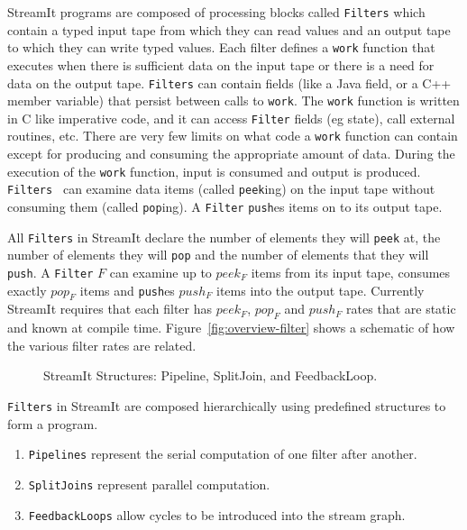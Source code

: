 StreamIt programs are composed of processing blocks called {\tt Filters} which
contain a typed input tape from which they can read values and an output tape to which
they can write typed values. Each filter defines a {\tt work} function that executes when there
is sufficient data on the input tape or there is a need for data on the output tape.
{\tt Filters} can contain fields (like a Java field, or a C++ member variable) that
persist between calls to {\tt work}. The {\tt work} function is written in C like imperative code, 
and it can access {\tt Filter} fields (eg state), call external routines, etc.
There are very few limits on what code a {\tt work} function can contain except for
producing and consuming the appropriate amount of data.  
During the execution of the {\tt work} function, input is consumed and output is produced.
{\tt Filters } can examine data items (called {\tt peek}ing) on the input tape without
consuming them (called {\tt pop}ing). A {\tt Filter} {\tt push}es items on to its output tape.

All {\tt Filters} in StreamIt declare the number of elements they
will {\tt peek} at, the number of elements they will {\tt pop} and the number
of elements that they will {\tt push}. A {\tt Filter} $F$ can examine up to $peek_{F}$ 
items from its input tape, consumes exactly $pop_{F}$ items and {\tt push}es 
$push_{F}$ items into the output tape. Currently StreamIt requires that each filter has 
$peek_F$, $pop_F$ and $push_F$ rates that are static and known at compile time. 
Figure~\ref{fig:overview-filter} shows a schematic of how the various filter rates are related.

\begin{figure}
\center
\epsfxsize=3.0in
\caption{StreamIt Structures: Pipeline, SplitJoin, and FeedbackLoop.}
\label{fig:structures}
\end{figure}

{\tt Filters} in StreamIt are composed hierarchically using predefined structures to form
a program. 

\begin{enumerate}
\item {\tt Pipelines} represent the serial computation of one filter after another.
\item {\tt SplitJoins} represent parallel computation. 
\item {\tt FeedbackLoops} allow cycles to be introduced into the stream graph. 
\end{enumerate}

